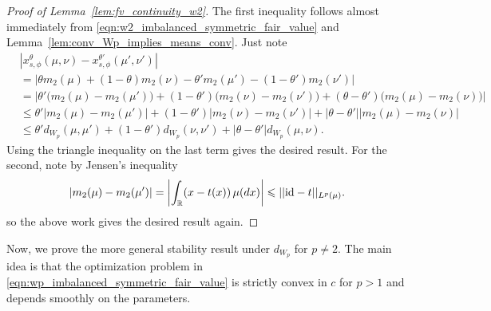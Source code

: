 \begin{subappendices}
\begin{proof}[Proof of Lemma~\ref{lem:fv_continuity_w2}]
    The first inequality follows almost immediately from \eqref{eqn:w2_imbalanced_symmetric_fair_value}
    and Lemma~\ref{lem:conv_Wp_implies_means_conv}. Just note
    \begin{align*}
        &\left|x_{s,\phi}^\theta(\mu, \nu) - x_{s,\phi}^{\theta'}(\mu', \nu')\right|\\
        &=
        \left|
        \theta m_2(\mu) + (1-\theta)m_2(\nu)
        - \theta' m_2(\mu') - (1-\theta')m_2(\nu')
        \right| \\[5pt]
        &=
        \left|
        \theta' \bigl(m_2(\mu)-m_2(\mu')\bigr)
        + (1-\theta')\bigl(m_2(\nu)-m_2(\nu')\bigr)
        + (\theta-\theta')\bigl(m_2(\mu)-m_2(\nu)\bigr)
        \right| \\[5pt]
        &\leq
        \theta' \left|m_2(\mu)-m_2(\mu')\right|
        + (1-\theta') \left|m_2(\nu)-m_2(\nu')\right|
        + |\theta-\theta'| \left|m_2(\mu)-m_2(\nu)\right| \\[5pt]
        &\leq
        \theta' d_{W_p}(\mu,\mu')
        + (1-\theta') d_{W_p}(\nu,\nu')
        + |\theta-\theta'| d_{W_p}(\mu,\nu).
    \end{align*}
    Using the triangle inequality on the last term gives the desired result. For the second, note by Jensen's inequality
    \[|m_2(\mu)-m_2(\mu')| = \left|\int_{\mathbb{R}} (x-t(x))\,\mu(dx)\right| \leqslant ||\mathrm{id}-t||_{L^p(\mu)}.\]
    \noindent so the above work gives the desired result again.
\end{proof}

\noindent Now, we prove the more general stability result under $d_{W_p}$ for $p \neq 2$.
The main idea is that the optimization problem in \eqref{eqn:wp_imbalanced_symmetric_fair_value} is strictly convex in $c$ for $p > 1$ and depends smoothly on the parameters.


\end{subappendices}
